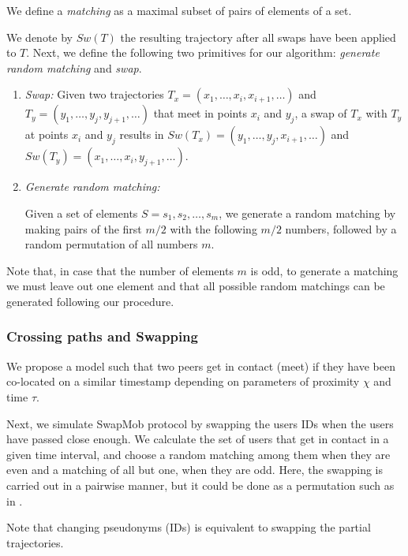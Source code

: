 \documentclass{llncs}
\begin{document}
We define a \emph{matching} as a maximal subset of pairs of elements of a set.

We denote by $Sw(T)$ the resulting trajectory after all swaps have been applied to $T$.
Next, we define the following two primitives for our algorithm: \emph{generate random matching} and \emph{swap}.
\begin{enumerate}

\item \emph{Swap:}
Given two trajectories $T_x = (x_1, \ldots, x_i, x_{i+1}, \ldots)$ and \linebreak
$T_y= (y_1, \ldots, y_j, y_{j+1}, \ldots)$ that meet in points $x_i$ and $y_j$, a swap of $T_x$ with $T_y$ at points $x_i$ and $y_j$ results in $Sw(T_x) = (y_1, \ldots, y_j, x_{i+1}, \ldots)$ and
\linebreak
$Sw(T_y)= (x_1, \ldots, x_i, y_{j+1}, \ldots)$.
\item \emph{Generate random matching:}

Given a set of elements $S = s_1, s_2,\ldots, s_m$, we generate a random matching by making pairs of the first $m/2$ with the following $m/2$ numbers, followed by a random permutation of all numbers $m$.
\end{enumerate}

Note that, in case that the number of elements $m$ is odd, to generate a matching we must leave out one element and that all possible random matchings can be generated following our procedure.

\subsubsection{Crossing paths and Swapping} \label{sec:cross}
We propose a model such that two peers get in contact (meet) if they have been co-located on a similar timestamp depending on parameters of proximity $\chi$ and time $\tau$.


Next, we simulate SwapMob protocol by swapping the users IDs when the users have passed close enough.
We calculate the set of users that get in contact in a given time interval, and choose a random matching among them when they are even and a matching of all but one, when they are odd.
Here, the swapping is carried out in a pairwise manner, but it could be done as a permutation such as in \cite{Beresford04mixzones}.

Note that changing pseudonyms (IDs) is equivalent to swapping the partial trajectories.
\end{document}
